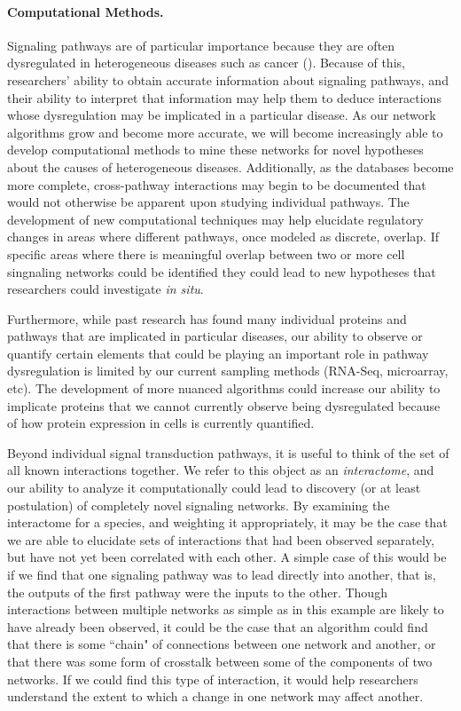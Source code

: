 \documentclass[12pt,twoside]{reedthesis}
\theoremstyle{definition}
\begin{document}
\paragraph{Computational Methods.}
Signaling pathways are of particular importance because they are often dysregulated in heterogeneous diseases such as cancer (\cite{Taylor2009}). Because of this, researchers' ability to obtain accurate information about signaling pathways, and their ability to interpret that information may help them to deduce interactions whose dysregulation may be implicated in a particular disease. As our network algorithms grow and become more accurate, we will become increasingly able to develop computational methods to mine these networks for novel hypotheses about the causes of heterogeneous diseases. Additionally, as the databases become more complete, cross-pathway interactions may begin to be documented that would not otherwise be apparent upon studying individual pathways. The development of new computational techniques may help elucidate regulatory changes in areas where different pathways, once modeled as discrete, overlap. If specific areas where there is meaningful overlap between two or more cell singnaling networks could be identified they could lead to new hypotheses that researchers could investigate \textit{in situ}.\par
Furthermore, while past research has found many individual proteins and pathways that are implicated in particular diseases, our ability to observe or quantify certain elements that could be playing an important role in pathway dysregulation is limited by our current sampling methods (RNA-Seq, microarray, etc). The development of more nuanced algorithms could increase our ability to implicate proteins that we cannot currently observe being dysregulated because of how protein expression in cells is currently quantified.\par

Beyond individual signal transduction pathways, it is useful to think of the set of all known interactions together. We refer to this object as an \textit{interactome}, and our ability to analyze it computationally could lead to discovery (or at least postulation) of completely novel signaling networks. By examining the interactome for a species, and weighting it appropriately, it may be the case that we are able to elucidate sets of interactions that had been observed separately, but have not yet been correlated with each other. A simple case of this would be if we find that one signaling pathway was to lead directly into another, that is, the outputs of the first pathway were the inputs to the other. Though interactions between multiple networks as simple as in this example are likely to have already been observed, it could be the case that an algorithm could find that there is some ``chain" of connections between one network and another, or that there was some form of crosstalk between some of the components of two networks. If we could find this type of interaction, it would help researchers understand the extent to which a change in one network may affect another.\par
\end{document}
